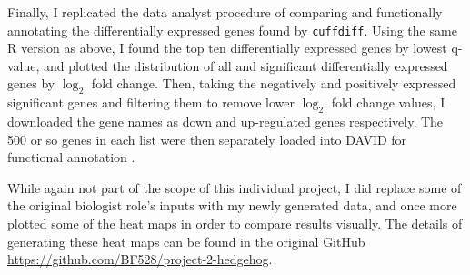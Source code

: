 \documentclass{article}
\begin{document}
Finally, I replicated the data analyst procedure of comparing and functionally annotating the differentially expressed genes found by \texttt{cuffdiff}. Using the same R version as above, I found the top ten differentially expressed genes by lowest q-value, and plotted the distribution of all and significant differentially expressed genes by $\log_2$ fold change. Then, taking the negatively and positively expressed significant genes and filtering them to remove lower $\log_2$ fold change values, I downloaded the gene names as down and up-regulated genes respectively. The 500 or so genes in each list were then separately loaded into DAVID  for functional annotation \cite{huangSystematicIntegrativeAnalysis2009}.

While again not part of the scope of this individual project, I did replace some of the original biologist role's inputs with my newly generated data, and once more plotted some of the heat maps in order to compare results visually. The details of generating these heat maps can be found in the original GitHub \url{https://github.com/BF528/project-2-hedgehog}.
\end{document}
